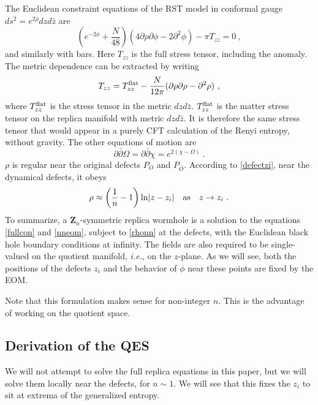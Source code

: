 \documentclass[11pt,oneside,letterpaper]{article}
\newcommand{\p}{\partial}
\newcommand{\be}{\begin{equation}}
\newcommand{\ee}{\end{equation}}
\def\be{\begin{eqnarray}}
\def\ee{\end{eqnarray}}
\def\be{\begin{equation}}
\def\ee{\end{equation}}
\def\log{{\rm ln}}
\renewcommand{\p}{\partial}
\numberwithin{equation}{section}
\def \be {\begin{equation}}
\def \ee {\end{equation}}
\begin{document}
The Euclidean constraint equations of the RST model in conformal gauge $ds^2 = e^{2\rho}dz d\bar{z}$ are
\be\label{fullcon}
\left( e^{-2\phi} + \frac{N}{48} \right) (4 \p \rho \p \phi - 2 \p^2 \phi) -\pi T_{zz} = 0 \ ,
\ee
and similarly with bars. Here $T_{zz}$ is the full stress tensor, including the anomaly. The metric dependence can be extracted by writing
\be
T_{zz} = T_{zz}^{\rm flat}  -  \frac{N}{12 \pi}(\p \rho \p \rho - \p^2 \rho)  \ ,
\ee
where $T_{zz}^{\rm flat}$ is the stress tensor in the metric $dz d\bar{z}$. $T_{zz}^{\rm flat}$ is the matter stress tensor on the replica manifold with metric $dz d\bar{z}$. It is therefore the same stress tensor that would appear in a purely CFT calculation of the Renyi entropy, without gravity. The other equations of motion are
\be\label{nneom}
\p \bar{\p} \Omega = \p \bar{\p} \chi = e^{2(\chi - \Omega)} \ .
\ee
$\rho$ is regular near the original defects $P_O$ and $P_{\bar{O}}$. According to \eqref{defectzi}, near the dynamical defects, it obeys
\be\label{rhonn}
\rho \approx \left( \frac{1}{n} - 1\right)\log |z-z_i| \quad \mbox{as}\quad z \to z_i \ .
\ee
To summarize, a $\mathbf{Z}_n$-symmetric replica wormhole is a solution to the equations \eqref{fullcon} and \eqref{nneom}, subject to \eqref{rhonn} at the defects, with the Euclidean black hole boundary conditions at infinity. The fields are also required to be single-valued on the quotient manifold, \textit{i.e.}, on the $z$-plane. As we will see, both the positions of the defects $z_i$  and the behavior of $\phi$ near these points are fixed by the EOM. 

Note that this formulation makes sense for non-integer $n$. This is the advantage of working on the quotient space.

\newcommand{\bz}{\bar{z}}
\newcommand{\bw}{\bar{w}}
\subsection{Derivation of the QES}

We will not attempt to solve the full replica equations in this paper, but we will solve them locally near the defects, for $n \sim 1$. We will see that this fixes the $z_i$ to sit at extrema of the generalized entropy. 
\end{document}
